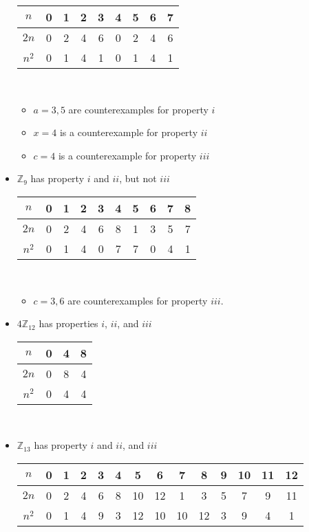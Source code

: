 \documentclass{article}
\begin{document}
\begin{itemize}
\begin{tabular} {|c|c|c|c|c|c|c|c|c|}
      \hline $n$   & 0 & 1 & 2 & 3 & 4 & 5 & 6 & 7\\ 
      \hline $2n$  & 0 & 2 & 4 & 6 & 0 & 2 & 4 & 6\\
      \hline $n^2$ & 0 & 1 & 4 & 1 & 0 & 1 & 4 & 1\\                       
      \hline 
    \end{tabular}\\
    \begin{itemize}
    \item $a=3,5$ are counterexamples for property $i$
    \item $x=4$ is a counterexample for property $ii$
    \item $c=4$ is a counterexample for property $iii$
    \end{itemize}
  \item $\mathbb{Z}_9$ has property $i$ and $ii$, but not $iii$\\
    \begin{tabular} {|c|c|c|c|c|c|c|c|c|c|}
      \hline $n$   & 0 & 1 & 2 & 3 & 4 & 5 & 6 & 7 & 8\\
      \hline $2n$  & 0 & 2 & 4 & 6 & 8 & 1 & 3 & 5 & 7\\
      \hline $n^2$ & 0 & 1 & 4 & 0 & 7 & 7 & 0 & 4 & 1\\                   
      \hline 
    \end{tabular}\\
    \begin{itemize}
    \item $c=3,6$ are counterexamples for property $iii$.
    \end{itemize}
  \item $4\mathbb{Z}_{12}$ has properties $i$, $ii$, and $iii$\\
    \begin{tabular} {|c|c|c|c|}
      \hline $n$   & 0 & 4 & 8\\
      \hline $2n$  & 0 & 8 & 4\\
      \hline $n^2$ & 0 & 4 & 4\\                       
      \hline 
    \end{tabular}\\
  \item $\mathbb{Z}_{13}$ has property $i$ and $ii$, and $iii$\\
    \begin{tabular} {|c|c|c|c|c|c|c|c|c|c|c|c|c|c|}
      \hline $n$   & 0 & 1 & 2 & 3 & 4 & 5 & 6 & 7 & 8 & 9 & 10 & 11 & 12\\
      \hline $2n$  & 0 & 2 & 4 & 6 & 8 & 10 & 12 & 1 & 3 & 5 & 7 & 9 & 11\\
      \hline $n^2$ & 0 & 1 & 4 & 9 & 3 & 12 & 10 & 10 & 12 & 3 & 9 & 4 & 1\\                   
      \hline 
    \end{tabular}\\
  \end{itemize}
\end{document}
